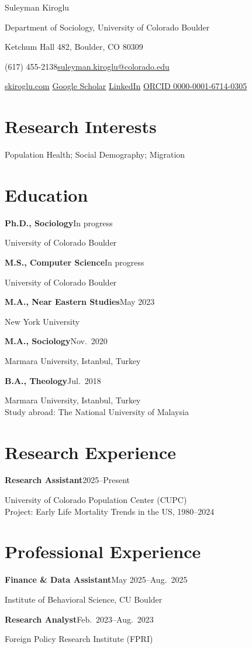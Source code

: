 \documentclass[11pt,letterpaper]{article}
\newcommand{\entry}[3]{%
  \textbf{#1}\hfill{\sffamily\small\color{muted}#2}\par
  #3\par\medskip}
\newcommand{\sep}{\enspace\textperiodcentered\enspace}
\begin{document}
{\sffamily\fontsize{21}{25}\selectfont Suleyman Kiroglu}\par
\vspace{6pt}
{\small
Department of Sociology, University of Colorado Boulder\par
Ketchum Hall 482, Boulder, CO 80309\par
(617) 455-2138\sep\href{mailto:suleyman.kiroglu@colorado.edu}{suleyman.kiroglu@colorado.edu}\par
\href{https://skiroglu.com}{skiroglu.com}\sep
\href{https://scholar.google.com/citations?user=0M_9ddcAAAAJ&hl=tr}{Google Scholar}\sep
\href{https://www.linkedin.com/in/suleymankiroglu/}{LinkedIn}\sep
\href{https://orcid.org/0000-0001-6714-0305}{ORCID 0000-0001-6714-0305}\par}

\section{Research Interests}
Population Health; Social Demography; Migration

\section{Education}
\entry{Ph.D., Sociology}{In progress}{University of Colorado Boulder}
\entry{M.S., Computer Science}{In progress}{University of Colorado Boulder}
\entry{M.A., Near Eastern Studies}{May 2023}{New York University}
\entry{M.A., Sociology}{Nov.\ 2020}{Marmara University, Istanbul, Turkey}
\entry{B.A., Theology}{Jul.\ 2018}{Marmara University, Istanbul, Turkey\\
  Study abroad: The National University of Malaysia}

\section{Research Experience}
\entry{Research Assistant}{2025--Present}{University of Colorado Population Center (CUPC)\\
  Project: Early Life Mortality Trends in the US, 1980--2024}

\section{Professional Experience}
\entry{Finance \& Data Assistant}{May 2025--Aug.\ 2025}{Institute of Behavioral Science, CU Boulder}
\entry{Research Analyst}{Feb.\ 2023--Aug.\ 2023}{Foreign Policy Research Institute (FPRI)}
\end{document}
